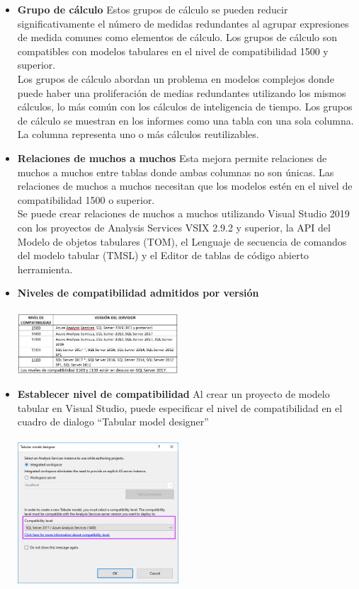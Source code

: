 \documentclass[twoside,twocolumn]{article}
\begin{document}
\begin{enumerate}
\begin{itemize}
\item \textbf{Grupo de cálculo} Estos grupos de cálculo se pueden reducir significativamente el número de medidas redundantes al agrupar expresiones de medida comunes como elementos de cálculo.  Los grupos de cálculo son compatibles con modelos tabulares en el nivel de compatibilidad 1500 y superior. \\  Los grupos de cálculo abordan un problema en modelos complejos donde puede haber una proliferación de medias redundantes utilizando los mismos cálculos, lo más común con los cálculos de inteligencia de tiempo.  Los grupos de cálculo se muestran en los informes como una tabla con una sola columna.  La columna representa uno o más cálculos reutilizables.
\item \textbf{Relaciones de muchos a muchos} Esta mejora permite relaciones de muchos a muchos entre tablas donde ambas columnas no son únicas.  Las relaciones de muchos a muchos necesitan que los modelos estén en el nivel de compatibilidad 1500 o superior.\\ Se puede crear relaciones de muchos a muchos utilizando Visual Studio 2019 con los proyectos de Analysis Services VSIX 2.9.2 y superior, la API del Modelo de objetos tabulares (TOM), el Lenguaje de secuencia de comandos del modelo tabular (TMSL) y el Editor de tablas de código abierto herramienta.
\item \textbf{Niveles de compatibilidad admitidos por versión} \\ \\
\includegraphics[width=6cm]{Imagenes/imagen3}\\
\item \textbf{Establecer nivel de compatibilidad} Al crear un proyecto de modelo tabular en Visual Studio, puede especificar el nivel de compatibilidad en el cuadro de dialogo “Tabular model designer” \\ \\
\includegraphics[width=6cm]{Imagenes/imagen4}\\

\end{itemize}
\end{enumerate}
\end{document}
